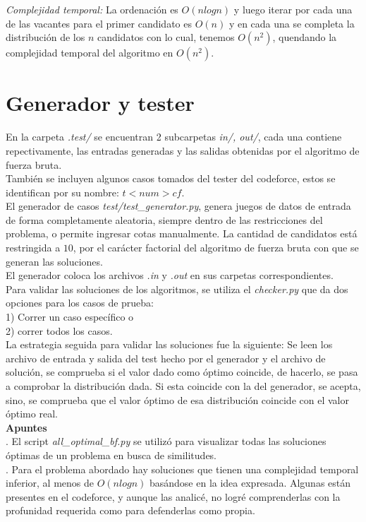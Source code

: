 \documentclass{article}
\begin{document}
\textit{Complejidad temporal:} La ordenación es $O(nlogn)$ y luego iterar por cada una de las vacantes para el primer candidato es $O(n)$ y en cada una se completa la distribuci\'on de los $n$ candidatos con lo cual, tenemos $O(n^2)$, quendando la complejidad temporal del algoritmo en $O(n^2)$.


\section{Generador y tester}

En la carpeta \textit{.test/} se encuentran 2 subcarpetas \textit{in/, out/}, cada una contiene repectivamente, las entradas generadas y las salidas obtenidas por el algoritmo de fuerza bruta.\\
Tambi\'en se incluyen algunos casos tomados del tester del codeforce, estos se identifican por su nombre: \textit{$t<num>cf$}.\\

El generador de casos \textit{test/test\_generator.py}, genera juegos de datos de entrada de forma completamente aleatoria, siempre dentro de las restricciones del problema, o permite ingresar cotas manualmente. La cantidad de candidatos est\'a restringida a $10$, por el car\'acter factorial del algoritmo de fuerza bruta con que se generan las soluciones.\\

El generador coloca los archivos \textit{.in} y \textit{.out} en sus carpetas correspondientes.\\

Para validar las soluciones de los algoritmos, se utiliza el \textit{checker.py} que da dos opciones para los casos de prueba:\\
1) Correr un caso espec\'ifico o \\
2) correr todos los casos.\\
La estrategia seguida para validar las soluciones fue la siguiente: Se leen los archivo de entrada y salida del test hecho por el generador y el archivo de soluci\'on, se comprueba si el valor dado como \'optimo coincide, de hacerlo, se pasa a comprobar la distribuci\'on dada. Si esta coincide con la del generador, se acepta, sino, se comprueba que el valor \'optimo de esa distribuci\'on coincide con el valor \'optimo real.\\

\textbf{Apuntes}\\

. El script \textit{all\_optimal\_bf.py} se utiliz\'o para visualizar todas las soluciones \'optimas de un problema en busca de similitudes.\\ 

. Para el problema abordado hay soluciones que tienen una complejidad temporal inferior, al menos de $O(nlogn)$ bas\'andose en la idea expresada. Algunas est\'an presentes en el codeforce, y aunque las analic\'e, no logr\'e comprenderlas con la profunidad requerida como para defenderlas como propia.
\end{document}
